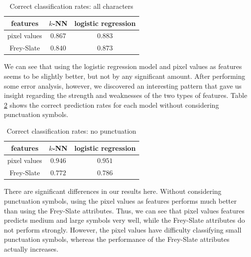 \documentclass[10pt]{IEEEtran}
\begin{document}
\begin{table}[h]
  \caption{Correct classification rates: all characters}
  \centering
  \begin{tabular}{c|c c}
  \hline
  features & $k$-NN & logistic regression\\
  \hline
  pixel values & $0.867$ & $0.883$ \\
  Frey-Slate & $0.840$ & $0.873$ \\
  \hline
  \end{tabular}
  \label{tab:allChars}
\end{table}

We can see that using the logistic regression model and pixel values as features seems to be slightly better, but not by any significant amount. After performing some error analysis, however, we discovered an interesting pattern that gave us insight regarding the strength and weaknesses of the two types of features. Table \ref{tab:alphanumeric} shows the correct prediction rates for each model without considering punctuation symbols.

\begin{table}[h]
  \caption{Correct classification rates: no punctuation}
  \centering
  \begin{tabular}{c|c c}
  \hline
  features & $k$-NN & logistic regression\\
  \hline
  pixel values & $0.946$ & $0.951$ \\
  Frey-Slate & $0.772$ & $0.786$ \\
  \hline
  \end{tabular}
  \label{tab:alphanumeric}
\end{table}

There are significant differences in our results here. Without considering punctuation symbols, using the pixel values as features performs much better than using the Frey-Slate attributes. Thus, we can see that pixel values features predicts medium and large symbols very well, while the Frey-Slate attributes do not perform strongly. However, the pixel values have difficulty classifying small punctuation symbols, whereas the performance of the Frey-Slate attributes actually increases.
\end{document}
